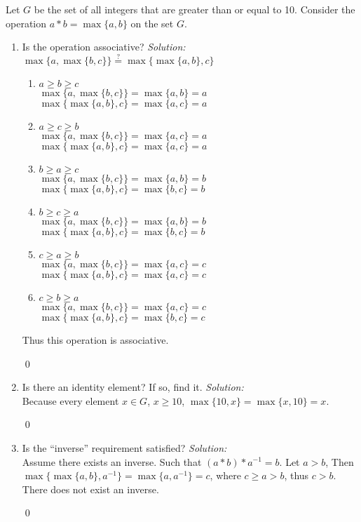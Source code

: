 \documentclass[12 pt]{article}
\newenvironment{problem}[2][Problem]{\begin{trivlist}
\item[\hskip \labelsep {\bfseries #1}\hskip \labelsep {\bfseries #2.}]}{\end{trivlist}}
\newenvironment{sol}
    {\emph{Solution:}
    }
    {
    \qed
    }
\theoremstyle{definition}
\begin{document}
\begin{problem}{3}
Let $G$ be the set of all integers that are greater than or equal to
10. Consider the operation $a*b = \max\{a,b\}$ on the set $G$.
\begin{enumerate}[label=\alph*)]
    \item  Is the operation associative? \begin{sol}\\
    $\max\{a,\max\{b,c\}\} \stackrel{?}{=} \max\{\max\{a,b\},c\}$
    \begin{enumerate}
        \item $a\geq b \geq c$\\
        $\max\{a,\max\{b,c\}\}=\max\{a,b\} = a$\\
        $\max\{\max\{a,b\},c\} = \max\{a,c\}=a$
        \item $a\geq c \geq b$\\
        $\max\{a,\max\{b,c\}\}=\max\{a,c\} = a$\\
        $\max\{\max\{a,b\},c\} = \max\{a,c\}=a$
        \item $b\geq a \geq c$\\
        $\max\{a,\max\{b,c\}\}=\max\{a,b\} = b$\\
        $\max\{\max\{a,b\},c\} = \max\{b,c\}=b$
        \item $b\geq c \geq a$\\
        $\max\{a,\max\{b,c\}\}=\max\{a,b\} = b$\\
        $\max\{\max\{a,b\},c\} = \max\{b,c\}=b$
        \item $c\geq a \geq b$\\
        $\max\{a,\max\{b,c\}\}=\max\{a,c\} = c$\\
        $\max\{\max\{a,b\},c\} = \max\{a,c\}=c$
        \item $c\geq b \geq a$\\
        $\max\{a,\max\{b,c\}\}=\max\{a,c\} = c$\\
        $\max\{\max\{a,b\},c\} = \max\{b,c\}=c$
    \end{enumerate}
    Thus this operation is associative.
    \end{sol}
    \item  Is there an identity element? If so, find it. \begin{sol}\\
    Because every element $x \in G$, $x \geq 10$, $\max\{10,x\}=\max\{x,10\}=x$.
    \end{sol}
    \item Is the “inverse” requirement satisfied? \begin{sol}\\
    Assume there exists an inverse. Such that $(a*b)*a^{-1}=b$. Let $a>b$, Then $\max\{\max\{a,b\},a^{-1}\}=\max\{a,a^{-1}\}=c$, where $c\geq a>b$, thus $c>b$. There does not exist an inverse.
    \end{sol}
\end{enumerate}
\end{problem}
\end{document}
